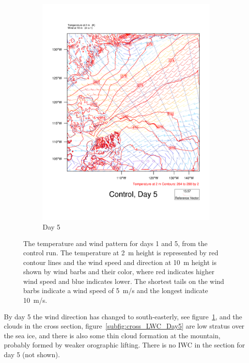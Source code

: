 \begin{figure}
\begin{subfigure}{0.48\textwidth}
        \includegraphics[width=\textwidth]{results/control/T2UV10_Control_Day5.pdf}
        \caption{Day 5}
        \label{subfig:weather_cont_day5}
    \end{subfigure}
    \caption{The temperature and wind pattern for days 1 and 5, from the control run. The temperature at 2~m height is represented by red contour lines and the wind speed and direction at 10~m height is shown by wind barbs and their color, where red indicates higher wind speed and blue indicates lower. The shortest tails on the wind barbs indicate a wind speed of 5~m/s and the longest indicate 10~m/s.}
    \label{fig:weather}
\end{figure}

By day 5 the wind direction has changed to south-easterly, see figure~\ref{subfig:weather_cont_day5}, and the clouds in the cross section, figure~\ref{subfig:cross_LWC_Day5} are low stratus over the sea ice, and there is also some thin cloud formation at the mountain, probably formed by weaker orographic lifting. There is no IWC in the section for day 5 (not shown).

